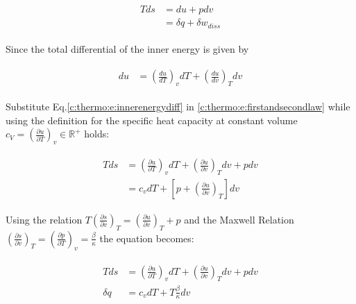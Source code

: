 \begin{align}
\begin{split}
T ds &= du + p dv \\
&= \delta q  + \delta w_{diss}
\end{split}
\label{c:thermo:e:firstandsecondlaw}
\end{align}

Since the total differential of the inner energy is given by


\begin{align}
\begin{split}
du &= \left( \frac{du}{dT} \right)_v dT  + \left( \frac{du}{dv} \right)_T dv
\end{split}
\label{c:thermo:e:innerenergydiff}
\end{align}

Substitute Eq.\ref{c:thermo:e:innerenergydiff} in \ref{c:thermo:e:firstandsecondlaw} while using the definition for the specific heat capacity at constant volume $c_V = \left(\frac{\partial u}{\partial T}\right)_v \in \mathbb{R}^+$ holds:

\begin{align*}
\begin{split}
T ds &= \left( \frac{\partial u}{\partial T} \right)_v dT  + \left( \frac{\partial u}{ \partial v} \right)_T dv + p dv \\
&= c_v dT + \left[ p + \left( \frac{\partial u}{\partial v}\right)_T\right] dv
\end{split}
\end{align*}

Using the relation \cite[p.375]{Struchtrup2014} $T\left( \frac{\partial s}{\partial v}\right)_T = \left( \frac{\partial u}{\partial v}\right)_T + p $ and the Maxwell Relation $\left( \frac{\partial s}{\partial v}\right)_T = \left( \frac{\partial p}{\partial T}\right)_v = \frac{\beta}{\kappa} $ the equation becomes:

\begin{align}
\begin{split}
T ds &= \left( \frac{\partial u}{\partial T} \right)_v dT  + \left( \frac{\partial u}{ \partial v} \right)_T dv + p dv \\
\delta q &= c_v dT + T \frac{\beta}{\kappa} dv
\end{split}
\label{c:thermo:e:isobaricHeat}
\end{align}

